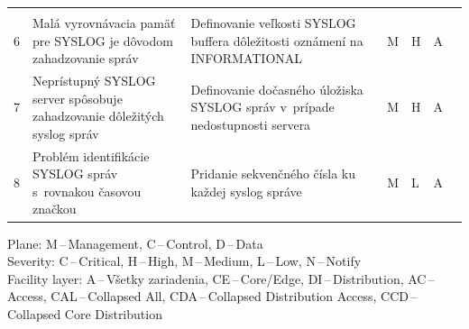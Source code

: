 \begin{longtable}[!htbp]{|C{2.5em}L{11em}L{11em}C{2.5em}C{4em}C{5em}L{2.5em}|}
	\cite{CIS_DrTLsgXv24lxeIIM}\\
	6	&Malá vyrovnávacia pamäť pre SYSLOG je dôvodom zahadzovanie správ	&Definovanie veľkosti SYSLOG buffera dôležitosti oznámení na INFORMATIONAL	&M	&H	&A	& \cite{Singh2018}\\
	 7	&Neprístupný SYSLOG server spôsobuje zahadzovanie dôležitých syslog správ	&Definovanie dočasného úložiska SYSLOG správ v~prípade nedostupnosti servera	&M	&H	&A	& \cite{Singh2018}\\
	8	&Problém identifikácie SYSLOG správ s~rovnakou časovou značkou	&Pridanie sekvenčného čísla ku každej syslog správe	&M	&L	&A	& \cite{Akin2002}\\
	
	\hline
\end{longtable}%
\vspace{-1em}
{\tiny 
	\noindent
	Plane: M\,--\,Management, C\,--\,Control, D\,--\,Data\\
	Severity: C\,--\,Critical, H\,--\,High, M\,--\,Medium, L\,--\,Low, N\,--\,Notify\\
	Facility layer: A\,--\,Všetky zariadenia, CE\,--\,Core/Edge, DI\,--\,Distribution, AC\,--\,Access, CAL\,--\,Collapsed All, CDA\,--\,Collapsed Distribution Access, CCD\,--\,Collapsed Core Distribution}

